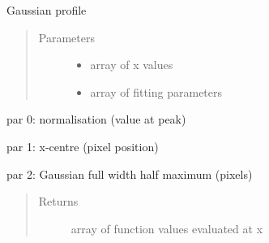 \documentclass[letterpaper,10pt,english]{sphinxmanual}
\begin{document}

\begin{fulllineitems}
\label{\detokenize{images_functions:images.gaussian}}
Gaussian profile
\begin{quote}\begin{description}
\item[{Parameters}] \leavevmode\begin{itemize}
\item {} 
 \textendash{} array of x values

\item {} 
 \textendash{} array of fitting parameters

\end{itemize}

\end{description}\end{quote}

\begin{DUlineblock}{0em}
\item[] par 0: normalisation (value at peak)
\item[] par 1: x-centre (pixel position)
\item[] par 2: Gaussian full width half maximum (pixels)
\end{DUlineblock}
\begin{quote}\begin{description}
\item[{Returns}] \leavevmode
array of function values evaluated at x

\end{description}\end{quote}

\end{fulllineitems}

\end{document}
